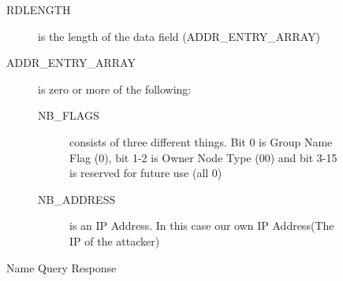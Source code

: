 \documentclass{article}
\begin{document}
\begin{figure}[H]
\begin{description}
		\item[RDLENGTH] is the length of the data field (ADDR\_ENTRY\_ARRAY)
		\item[ADDR\_ENTRY\_ARRAY] is zero or more of the following:
		      \begin{description}
			      \item[NB\_FLAGS] consists of three different things. Bit 0 is Group Name Flag (0), bit 1-2 is Owner Node Type (00) and bit 3-15 is reserved for future use (all 0)
			      \item[NB\_ADDRESS] is an IP Address. In this case our own IP Address(The IP of the attacker)
		      \end{description}
	\end{description}
	\caption{ Name Query Response\cite[sec. 4.2.13]{url:rfc:netbios-technical}}
	\label{fig:nbns-name-query-response}
\end{figure}
\end{document}
